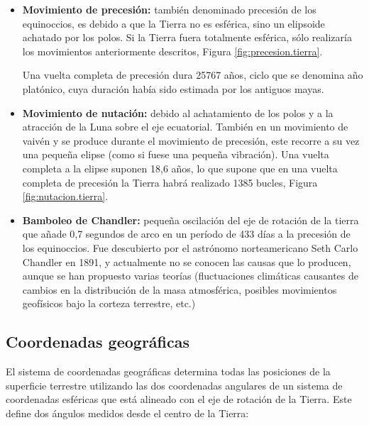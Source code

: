 \begin{itemize}
\item \textbf{Movimiento de precesión:} 
también denominado precesión de los equinoccios, es debido a que la Tierra no es esférica, sino un elipsoide achatado por los polos. Si la Tierra fuera totalmente esférica, sólo realizaría los movimientos anteriormente descritos, Figura \ref{fig:precesion.tierra}.

Una vuelta completa de precesión dura 25767 años, ciclo que se denomina año platónico, cuya duración había sido estimada por los antiguos mayas.

\item \textbf{Movimiento de nutación:} debido al achatamiento de los polos y a la atracción de la Luna sobre el eje ecuatorial. También en un movimiento de vaivén y se produce durante el movimiento de precesión, este recorre a su vez una pequeña elipse (como si fuese una pequeña vibración). Una vuelta completa a la elipse suponen 18,6 años, lo que supone que en una vuelta completa de precesión la Tierra habrá realizado 1385 bucles, Figura \ref{fig:nutacion.tierra}.

\item \textbf{Bamboleo de Chandler:} pequeña oscilación del eje de rotación de la tierra que añade 0,7 segundos de arco en un período de 433 días a la precesión de los equinoccios. Fue descubierto por el astrónomo norteamericano Seth Carlo Chandler en 1891, y actualmente no se conocen las causas que lo producen, aunque se han propuesto varias teorías (fluctuaciones climáticas causantes de cambios en la distribución de la masa atmosférica, posibles movimientos geofísicos bajo la corteza terrestre, etc.)


\end{itemize}


\subsection{Coordenadas geogr\'aficas}

El sistema de coordenadas geogr\'aficas determina todas las posiciones de la superficie terrestre utilizando las dos coordenadas angulares de un sistema de coordenadas esf\'ericas que est\'a alineado con el eje de rotaci\'on de la Tierra. Este define dos \'angulos medidos desde el centro de la Tierra:

